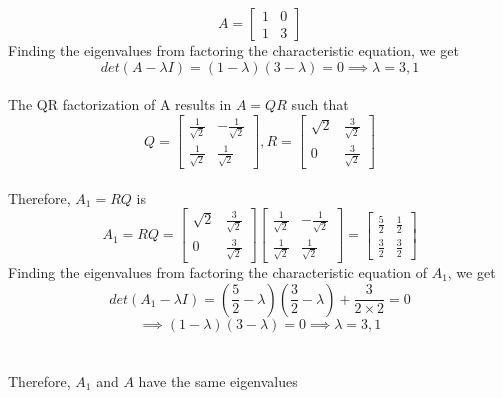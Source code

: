 \documentclass[12pt]{article}
\begin{document}
$$
A = \begin{bmatrix}
1 & 0 \\
1 & 3 
\end{bmatrix} 
$$
    Finding the eigenvalues from factoring the characteristic equation, we get \\
    $$det(A - \lambda I) = (1 - \lambda)(3 - \lambda) = 0 \implies \lambda = 3,1$$ \\
    The QR factorization of A results in $A = QR$ such that \\
    $$
    Q = \begin{bmatrix}
        \frac{1}{\sqrt{2}} & -\frac{1}{\sqrt{2}} \\
        \frac{1}{\sqrt{2}} & \frac{1}{\sqrt{2}} 
        \end{bmatrix},
    R = \begin{bmatrix}
        \sqrt{2} & \frac{3}{\sqrt{2}} \\
        0 & \frac{3}{\sqrt{2}} 
        \end{bmatrix}
    $$ \\
    Therefore, $A_1 = RQ$ is \\
    $$
    A_1 = RQ = 
    \begin{bmatrix}
        \sqrt{2} & \frac{3}{\sqrt{2}} \\
        0 & \frac{3}{\sqrt{2}} 
    \end{bmatrix}
    \begin{bmatrix}
        \frac{1}{\sqrt{2}} & -\frac{1}{\sqrt{2}} \\
        \frac{1}{\sqrt{2}} & \frac{1}{\sqrt{2}} 
    \end{bmatrix}
    =
    \begin{bmatrix}
        \frac{5}{2} & \frac{1}{2} \\
        \frac{3}{2} & \frac{3}{2} 
    \end{bmatrix}
    $$
    Finding the eigenvalues from factoring the characteristic equation of $A_1$, we get \\
    $$det(A_1 - \lambda I) = (\frac{5}{2} - \lambda)(\frac{3}{2} - \lambda) + \frac{3}{2 \times 2} = 0
    $$
    $$\implies (1 - \lambda)(3 - \lambda) = 0 \implies \lambda = 3,1$$ \\\\

    Therefore, $A_1$ and $A$ have the same eigenvalues
\end{document}
